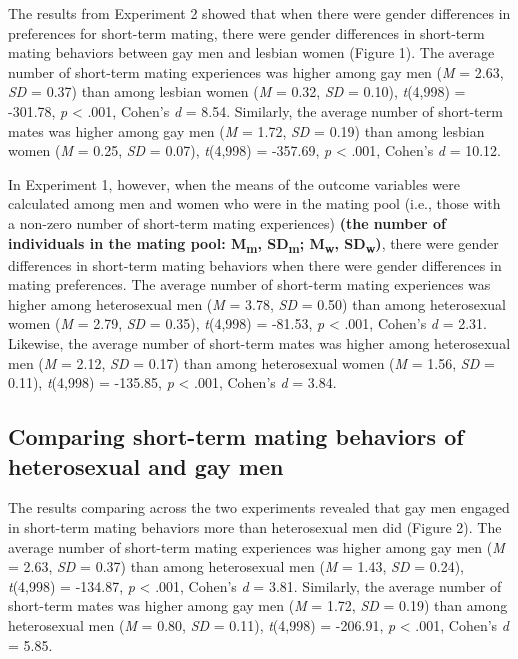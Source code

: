 \documentclass[
  11pt,
]{article}
\begin{document}
The results from Experiment 2 showed that when there were gender
differences in preferences for short-term mating, there were gender
differences in short-term mating behaviors between gay men and lesbian
women (Figure 1). The average number of short-term mating experiences
was higher among gay men (\emph{M} = 2.63, \emph{SD} = 0.37) than among
lesbian women (\emph{M} = 0.32, \emph{SD} = 0.10), \emph{t}(4,998) =
-301.78, \emph{p} \textless{} .001, Cohen's \emph{d} = 8.54. Similarly,
the average number of short-term mates was higher among gay men
(\emph{M} = 1.72, \emph{SD} = 0.19) than among lesbian women (\emph{M} =
0.25, \emph{SD} = 0.07), \emph{t}(4,998) = -357.69, \emph{p} \textless{}
.001, Cohen's \emph{d} = 10.12.

In Experiment 1, however, when the means of the outcome variables were
calculated among men and women who were in the mating pool (i.e., those
with a non-zero number of short-term mating experiences) \textbf{(the
number of individuals in the mating pool: M\textsubscript{m},
SD\textsubscript{m}; M\textsubscript{w}, SD\textsubscript{w})}, there
were gender differences in short-term mating behaviors when there were
gender differences in mating preferences. The average number of
short-term mating experiences was higher among heterosexual men
(\emph{M} = 3.78, \emph{SD} = 0.50) than among heterosexual women
(\emph{M} = 2.79, \emph{SD} = 0.35), \emph{t}(4,998) = -81.53, \emph{p}
\textless{} .001, Cohen's \emph{d} = 2.31. Likewise, the average number
of short-term mates was higher among heterosexual men (\emph{M} = 2.12,
\emph{SD} = 0.17) than among heterosexual women (\emph{M} = 1.56,
\emph{SD} = 0.11), \emph{t}(4,998) = -135.85, \emph{p} \textless{} .001,
Cohen's \emph{d} = 3.84.

\hypertarget{comparing-short-term-mating-behaviors-of-heterosexual-and-gay-men}{%
\subsection{Comparing short-term mating behaviors of heterosexual and
gay
men}\label{comparing-short-term-mating-behaviors-of-heterosexual-and-gay-men}}

The results comparing across the two experiments revealed that gay men
engaged in short-term mating behaviors more than heterosexual men did
(Figure 2). The average number of short-term mating experiences was
higher among gay men (\emph{M} = 2.63, \emph{SD} = 0.37) than among
heterosexual men (\emph{M} = 1.43, \emph{SD} = 0.24), \emph{t}(4,998) =
-134.87, \emph{p} \textless{} .001, Cohen's \emph{d} = 3.81. Similarly,
the average number of short-term mates was higher among gay men
(\emph{M} = 1.72, \emph{SD} = 0.19) than among heterosexual men
(\emph{M} = 0.80, \emph{SD} = 0.11), \emph{t}(4,998) = -206.91, \emph{p}
\textless{} .001, Cohen's \emph{d} = 5.85.
\end{document}
